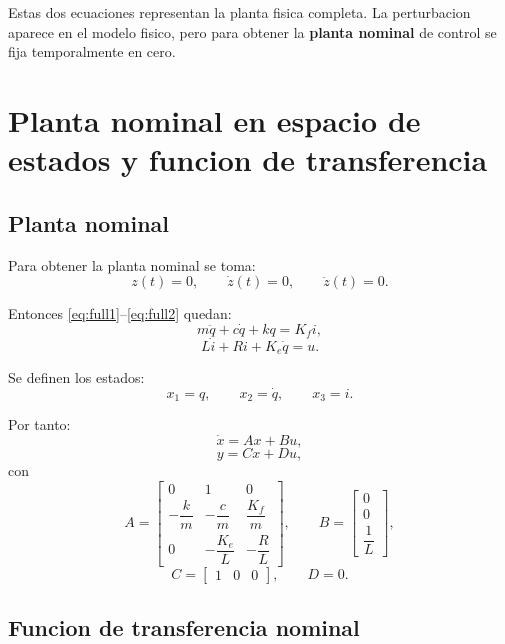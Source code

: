 \documentclass[11pt]{article}
\begin{document}
Estas dos ecuaciones representan la planta fisica completa. La perturbacion aparece en el modelo fisico, pero para obtener la \textbf{planta nominal} de control se fija temporalmente en cero.

\section{Planta nominal en espacio de estados y funcion de transferencia}

\subsection{Planta nominal}

Para obtener la planta nominal se toma:
\[
z(t)=0,\qquad \dot z(t)=0,\qquad \ddot z(t)=0.
\]

Entonces \eqref{eq:full1}--\eqref{eq:full2} quedan:
\begin{equation}
m\ddot q + c\dot q + kq = K_f i,
\end{equation}
\begin{equation}
L\dot i + Ri + K_e\dot q = u.
\end{equation}

Se definen los estados:
\[
x_1=q,\qquad x_2=\dot q,\qquad x_3=i.
\]

Por tanto:
\begin{equation}
\dot x = Ax+Bu,
\end{equation}
\begin{equation}
y = Cx+Du,
\end{equation}
con
\begin{equation}
A=
\begin{bmatrix}
0 & 1 & 0\\
-\dfrac{k}{m} & -\dfrac{c}{m} & \dfrac{K_f}{m}\\
0 & -\dfrac{K_e}{L} & -\dfrac{R}{L}
\end{bmatrix},
\qquad
B=
\begin{bmatrix}
0\\
0\\
\dfrac{1}{L}
\end{bmatrix},
\end{equation}
\begin{equation}
C=
\begin{bmatrix}
1 & 0 & 0
\end{bmatrix},
\qquad
D=0.
\end{equation}

\subsection{Funcion de transferencia nominal}
\end{document}
